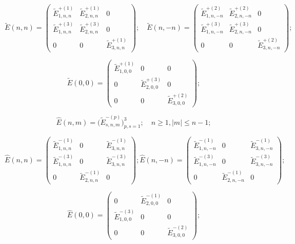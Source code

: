 \begin{equation*}
\tilde E(n,n)=
\begin{pmatrix}
\tilde E_{1,n,n}^{+(1)} & \tilde E_{2,n,n}^{+(1)} & 0 \\
\tilde E_{1,n,n}^{+(3)} & \tilde E_{2,n,n}^{+(3)} & 0 \\
0 & 0 & \tilde E_{3,n,n}^{+(1)}
\end{pmatrix};\quad
\tilde E(n,-n)=
\begin{pmatrix}
\tilde E_{1,n,-n}^{+(2)} & \tilde E_{2,n,-n}^{+(2)} & 0 \\
\tilde E_{1,n,-n}^{+(3)} & \tilde E_{2,n,-n}^{+(3)} & 0 \\
0 & 0 & \tilde E_{3,n,-n}^{+(2)}
\end{pmatrix};
\end{equation*}

\begin{equation*}
\tilde E(0,0)=
\begin{pmatrix}
\tilde E_{1,0,0}^{+(1)} & 0 & 0 \\
0 & \tilde E_{2,0,0}^{+(3)} & 0 \\
0 & 0 & \tilde E_{3,0,0}^{+(2)}
\end{pmatrix};
\end{equation*}

$$
\hat E(n,m)=\bigg(\tilde E_{s,n,m}^{-(p)}\bigg)_{p,s=1}^3;\quad n\ge 1, |m|\le n-1;
$$

\begin{equation*}
\hat E(n,n)=
\begin{pmatrix}
\tilde E_{1,n,n}^{-(1)} & 0 & \tilde E_{3,n,n}^{-(1)} \\
\tilde E_{1,n,n}^{-(3)} & 0 & \tilde E_{3,n,n}^{-(3)} \\
0 & \tilde E_{2,n,n}^{-(1)} & 0
\end{pmatrix};
\hat E(n,-n)=
\begin{pmatrix}
\tilde E_{1,n,-n}^{-(1)} & 0 & \tilde E_{3,n,-n}^{-(1)} \\
\tilde E_{1,n,-n}^{-(3)} & 0 & \tilde E_{3,n,-n}^{-(3)} \\
0 & \tilde E_{2,n,-n}^{-(1)} & 0
\end{pmatrix};
\end{equation*}

\begin{equation*}
\hat E(0,0)=
\begin{pmatrix}
0 & \tilde E_{2,0,0}^{-(1)} & 0 \\
\tilde E_{1,0,0}^{-(3)} & 0 & 0 \\
0 & 0 & \tilde E_{3,0,0}^{-(2)}
\end{pmatrix};
\end{equation*}

